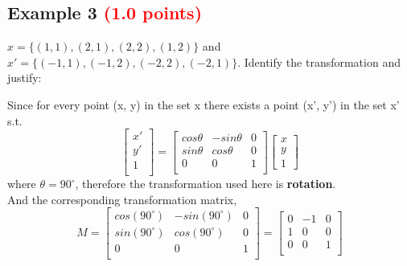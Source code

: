 \documentclass[answers]{exam}
\newcommand{\mypoints}[1]{\textcolor{red}{(#1 points)}}
\begin{document}
\subsection{Example 3 \mypoints{1.0}}
$x = \{(1,1), (2,1), (2,2), (1,2)\}$ and $x' = \{(-1,1), (-1,2), (-2,2), (-2,1)\}$. Identify the transformation and justify:
\begin{solution}
Since for every point (x, y) in the set x there exists a point (x', y') in the set x' s.t. \\
$$
\begin{bmatrix} 
x'\\
y'\\
1\\
\end{bmatrix}
=
\begin{bmatrix}
cos\theta & -sin\theta & 0\\
sin\theta & cos\theta & 0\\
0 & 0 & 1\\
\end{bmatrix}
\begin{bmatrix}
x\\
y\\
1
\end{bmatrix}
$$
where $\theta = 90^{\circ}$, therefore the transformation used here is \textbf{rotation}.\\
And the corresponding transformation matrix,\\
$$M = \begin{bmatrix}
cos(90^{\circ}) & -sin(90^{\circ}) & 0\\
sin(90^{\circ}) & cos(90^{\circ}) & 0\\
0 & 0 & 1\\
\end{bmatrix}
=
\begin{bmatrix}
0 & -1 & 0\\
1 & 0 & 0\\
0 & 0 & 1\\
\end{bmatrix}$$
\end{solution}
\end{document}
